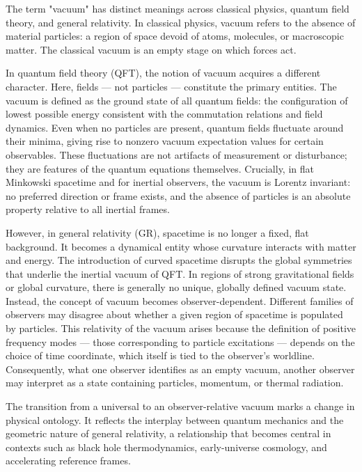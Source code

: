 The term "vacuum" has distinct meanings across classical physics, quantum field theory, and general relativity. In classical physics, vacuum refers to the absence of material particles: a region of space devoid of atoms, molecules, or macroscopic matter. The classical vacuum is an empty stage on which forces act.

In quantum field theory (QFT), the notion of vacuum acquires a different character. Here, fields — not particles — constitute the primary entities. The vacuum is defined as the ground state of all quantum fields: the configuration of lowest possible energy consistent with the commutation relations and field dynamics. Even when no particles are present, quantum fields fluctuate around their minima, giving rise to nonzero vacuum expectation values for certain observables. These fluctuations are not artifacts of measurement or disturbance; they are features of the quantum equations themselves. Crucially, in flat Minkowski spacetime and for inertial observers, the vacuum is Lorentz invariant: no preferred direction or frame exists, and the absence of particles is an absolute property relative to all inertial frames.

However, in general relativity (GR), spacetime is no longer a fixed, flat background. It becomes a dynamical entity whose curvature interacts with matter and energy. The introduction of curved spacetime disrupts the global symmetries that underlie the inertial vacuum of QFT. In regions of strong gravitational fields or global curvature, there is generally no unique, globally defined vacuum state. Instead, the concept of vacuum becomes observer-dependent. Different families of observers may disagree about whether a given region of spacetime is populated by particles. This relativity of the vacuum arises because the definition of positive frequency modes — those corresponding to particle excitations — depends on the choice of time coordinate, which itself is tied to the observer's worldline. Consequently, what one observer identifies as an empty vacuum, another observer may interpret as a state containing particles, momentum, or thermal radiation.

The transition from a universal to an observer-relative vacuum marks a change in physical ontology. It reflects the interplay between quantum mechanics and the geometric nature of general relativity, a relationship that becomes central in contexts such as black hole thermodynamics, early-universe cosmology, and accelerating reference frames.

